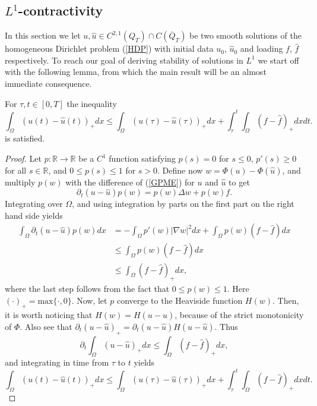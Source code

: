 \documentclass[11pt, a4paper]{article}
\begin{document}
\subsection{$L^1$-contractivity}
In this section we let $u,\hat{u} \in C^{2,1}(Q_T)\cap C(\overline{Q}_T)$ be two smooth solutions of the homogeneous Dirichlet problem (\ref{HDP}) with initial data $u_0$, $\hat{u}_0$ and loading $f$, $\hat{f}$ respectively. To reach our goal of deriving stability of solutions in $L^1$ we start off with the following lemma, from which the main result will be an almost immediate consequence.

\begin{lemma}
For $\tau, t \in [0,T]$ the inequality 
\begin{equation}
\label{l1_contr_part1}
\int_{\Omega}(u(t)-\hat{u}(t))_+dx \leq \int_{\Omega}(u(\tau)-\hat{u}(\tau))_+dx + \int_\tau^t\int_{\Omega}(f-\hat{f})_+dxdt.
\end{equation}
is satisfied.
\end{lemma}

\begin{proof}
Let $p: \mathbb{R} \to \mathbb{R}$ be a $C^1$ function satisfying $p(s) = 0$ for $s \leq 0$, $p'(s) \geq 0$ for all $s\in \mathbb{R}$, and $0 \leq p(s) \leq 1$ for $s > 0$. Define now $w = \Phi(u) - \Phi(\hat{u})$, and multiply $p(w)$ with the difference of (\ref{GPME}) for $u$ and $\hat{u}$ to get
\begin{equation*}
\partial_t(u-\hat{u})p(w) = p(w)\Delta w + p(w)f.
\end{equation*}
Integrating over $\Omega$, and using integration by parts on the first part on the right hand side yields
\begin{align*}
\int_{\Omega}\partial_t(u-\hat{u})p(w)dx &= -\int_{\Omega}p'(w)|\nabla w|^2dx + \int_{\Omega}p(w)(f-\hat{f}) dx \\
	&\leq \int_{\Omega}p(w)(f-\hat{f}) dx \\
	&\leq \int_{\Omega}(f-\hat{f})_+ dx,
\end{align*}
where the last step follows from the fact that $0 \leq p(w) \leq 1$. Here $(\cdot)_+ = \mathrm{max}\{\cdot, 0\}$.
Now, let $p$ converge to the Heaviside function $H(w)$. Then, it is worth noticing that $H(w) = H(u-\hat{u})$, because of the strict monotonicity of $\Phi$. Also see that $\partial_t(u-\hat{u})_+ = \partial_t(u-\hat{u})H(u-\hat{u})$. Thus
\begin{equation*}
\partial_t \int_{\Omega}(u-\hat{u})_+dx \leq \int_{\Omega}(f-\hat{f})_+ dx,
\end{equation*}
and integrating in time from $\tau$ to $t$ yields
\begin{equation*}
\int_{\Omega}(u(t)-\hat{u}(t))_+dx \leq \int_{\Omega}(u(\tau)-\hat{u}(\tau))_+dx + \int_\tau^t\int_{\Omega}(f-\hat{f})_+dxdt.
\end{equation*}
\end{proof}
\end{document}
